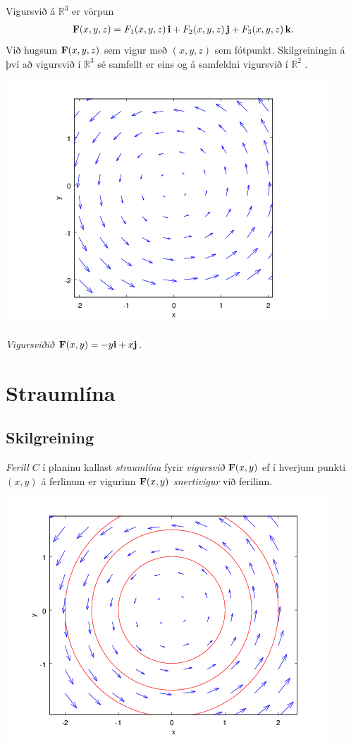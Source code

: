 \documentclass[a4paper,10pt,icelandic]{sphinxmanual}
\begin{document}
Vigursvið á \({\mathbb  R}^3\) er vörpun
\begin{gather}
\begin{split}\displaystyle \mbox{${\bf F}$}(x,y,z)=F_1(x,y,z)\,\mbox{${\bf i}$}+F_2(x,y,z)\,\mbox{${\bf j}$}+F_3(x,y,z)\,\mbox{${\bf k}$}.\end{split}\notag
\end{gather}
Við hugsum \(\mbox{${\bf F}$}(x,y,z)\) sem vigur með \((x,y,z)\)
sem fótpunkt. Skilgreiningin á því að vigursvið í \({\mathbb  R}^3\)
sé samfellt er eins og á samfeldni vigursvið í \({\mathbb  R}^2\) .

{\hfill\includegraphics[width=0.700\linewidth]{vfield.png}\hfill}

\emph{Vigursviðið} \(\mathbf{F}(x,y) = -y\mbox{${\bf i}$}+ x \mbox{${\bf j}$}\).


\section{Straumlína}
\label{Kafli5:straumlina}\label{Kafli5:index-1}

\subsection{Skilgreining}
\label{Kafli5:id2}
\textit{Ferill} \(C\) í planinu kallast \textit{straumlína} fyrir \textit{vigursvið} \(\mbox{${\bf F}$}(x,y)\) ef í hverjum punkti
\((x,y)\) á ferlinum er vigurinn \(\mbox{${\bf F}$}(x,y)\)
\textit{snertivigur} við ferilinn.

{\hfill\includegraphics[width=0.700\linewidth]{flowlines.png}\hfill}
\end{document}
